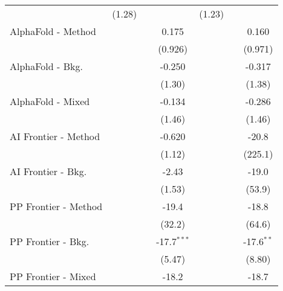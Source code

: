 \begin{tabular}{lcccccc}
                                  & (1.28)         &               &               & (1.23)         &               &   \\   
   AlphaFold - Method             &                &               & 0.175         &                &               & 0.160\\   
                                  &                &               & (0.926)       &                &               & (0.971)\\   
   AlphaFold - Bkg.               &                &               & -0.250        &                &               & -0.317\\   
                                  &                &               & (1.30)        &                &               & (1.38)\\   
   AlphaFold - Mixed              &                &               & -0.134        &                &               & -0.286\\   
                                  &                &               & (1.46)        &                &               & (1.46)\\   
   AI Frontier - Method           &                &               & -0.620        &                &               & -20.8\\   
                                  &                &               & (1.12)        &                &               & (225.1)\\   
   AI Frontier - Bkg.             &                &               & -2.43         &                &               & -19.0\\   
                                  &                &               & (1.53)        &                &               & (53.9)\\   
   PP Frontier - Method           &                &               & -19.4         &                &               & -18.8\\   
                                  &                &               & (32.2)        &                &               & (64.6)\\   
   PP Frontier - Bkg.             &                &               & -17.7$^{***}$ &                &               & -17.6$^{**}$\\   
                                  &                &               & (5.47)        &                &               & (8.80)\\   
   PP Frontier - Mixed            &                &               & -18.2         &                &               & -18.7\\   

\end{tabular}
